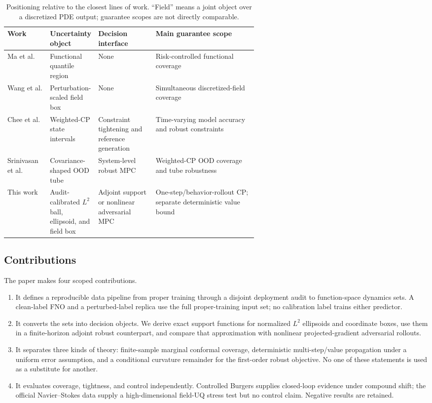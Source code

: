 \documentclass[10pt]{article}
\begin{document}
\begin{table}[t]
\centering
\scriptsize
\caption{Positioning relative to the closest lines of work. ``Field'' means a
joint object over a discretized PDE output; guarantee scopes are not directly
comparable.}
\label{tab:related}
\begin{tabularx}{\linewidth}{@{}p{0.17\linewidth}p{0.19\linewidth}p{0.23\linewidth}X@{}}
\toprule
Work & Uncertainty object & Decision interface & Main guarantee scope\\
\midrule
Ma et al. \cite{ma2024calibrated} & Functional quantile region & None & Risk-controlled functional coverage\\
Wang et al. \cite{wang2026perturbation} & Perturbation-scaled field box & None & Simultaneous discretized-field coverage\\
Chee et al. \cite{chee2024conformal} & Weighted-CP state intervals & Constraint tightening and reference generation & Time-varying model accuracy and robust constraints\\
Srinivasan et al. \cite{srinivasan2026ood} & Covariance-shaped OOD tube & System-level robust MPC & Weighted-CP OOD coverage and tube robustness\\
This work & Audit-calibrated $L^2$ ball, ellipsoid, and field box & Adjoint support or nonlinear adversarial MPC & One-step/behavior-rollout CP; separate deterministic value bound\\
\bottomrule
\end{tabularx}
\end{table}

\subsection{Contributions}

The paper makes four scoped contributions.
\begin{enumerate}[label=(\roman*)]
\item It defines a reproducible data pipeline from proper training through a
disjoint deployment audit to function-space dynamics sets. A clean-label FNO
and a perturbed-label replica use the full proper-training input set; no
calibration label trains either predictor.
\item It converts the sets into decision objects. We derive exact support
functions for normalized $L^2$ ellipsoids and coordinate boxes, use them in a
finite-horizon adjoint robust counterpart, and compare that approximation with
nonlinear projected-gradient adversarial rollouts.
\item It separates three kinds of theory: finite-sample marginal conformal
coverage, deterministic multi-step/value propagation under a uniform error
assumption, and a conditional curvature remainder for the first-order robust
objective. No one of these statements is used as a substitute for another.
\item It evaluates coverage, tightness, and control independently. Controlled
Burgers supplies closed-loop evidence under compound shift; the official
Navier--Stokes data supply a high-dimensional field-UQ stress test but no
control claim. Negative results are retained.
\end{enumerate}
\end{document}
